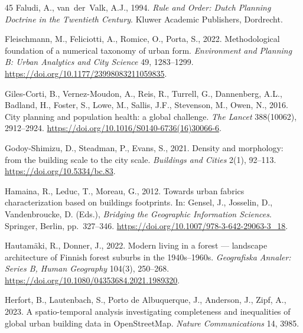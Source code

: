 \documentclass[review,authoryear]{elsarticle}
\begin{document}
\begin{thebibliography}{45}
  Faludi, A., van~der~Valk, A.J., 1994.
  \newblock \emph{Rule and Order: Dutch Planning Doctrine in the Twentieth Century}.
  \newblock Kluwer Academic Publishers, Dordrecht.

  Fleischmann, M., Feliciotti, A., Romice, O., Porta, S., 2022.
  \newblock Methodological foundation of a numerical taxonomy of urban form.
  \newblock \emph{Environment and Planning B: Urban Analytics and City Science} 49, 1283--1299.
  \newblock \url{https://doi.org/10.1177/23998083211059835}.

  Giles-Corti, B., Vernez-Moudon, A., Reis, R., Turrell, G., Dannenberg, A.L., Badland, H., Foster, S., Lowe, M., Sallis, J.F., Stevenson, M., Owen, N., 2016.
  \newblock City planning and population health: a global challenge.
  \newblock \emph{The Lancet} 388(10062), 2912--2924.
  \newblock \url{https://doi.org/10.1016/S0140-6736(16)30066-6}.

  Godoy-Shimizu, D., Steadman, P., Evans, S., 2021.
  \newblock Density and morphology: from the building scale to the city scale.
  \newblock \emph{Buildings and Cities} 2(1), 92--113.
  \newblock \url{https://doi.org/10.5334/bc.83}.

  Hamaina, R., Leduc, T., Moreau, G., 2012.
  \newblock Towards urban fabrics characterization based on buildings footprints.
  \newblock In: Gensel, J., Josselin, D., Vandenbroucke, D. (Eds.), \emph{Bridging the Geographic Information Sciences}. Springer, Berlin, pp.~327--346.
  \newblock \url{https://doi.org/10.1007/978-3-642-29063-3_18}.

  Hautam\"aki, R., Donner, J., 2022.
  \newblock Modern living in a forest --- landscape architecture of Finnish forest suburbs in the 1940s--1960s.
  \newblock \emph{Geografiska Annaler: Series B, Human Geography} 104(3), 250--268.
  \newblock \url{https://doi.org/10.1080/04353684.2021.1989320}.

  Herfort, B., Lautenbach, S., Porto de Albuquerque, J., Anderson, J., Zipf, A., 2023.
  \newblock A spatio-temporal analysis investigating completeness and inequalities of global urban building data in OpenStreetMap.
  \newblock \emph{Nature Communications} 14, 3985.


\end{thebibliography}
\end{document}
